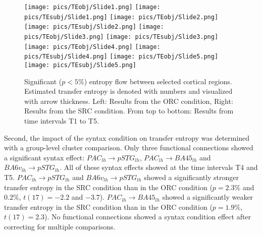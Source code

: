 \begin{figure}[h]
	\begin{center}
		\begin{minipage}{\textwidth}
			\texttt{[image: pics/TEobj/Slide1.png]}
			\texttt{[image: pics/TEsubj/Slide1.png]}
			\texttt{[image: pics/TEobj/Slide2.png]}
			\texttt{[image: pics/TEsubj/Slide2.png]}
			\texttt{[image: pics/TEobj/Slide3.png]}
			\texttt{[image: pics/TEsubj/Slide3.png]}
			\texttt{[image: pics/TEobj/Slide4.png]}
			\texttt{[image: pics/TEsubj/Slide4.png]}
			\texttt{[image: pics/TEobj/Slide5.png]}
			\texttt{[image: pics/TEsubj/Slide5.png]}
		\end{minipage}
		\caption{\label{4.4.networkgraph.a} Significant ($p < 5\%$) entropy flow between selected cortical regions. Estimated transfer entropy is denoted with numbers and visualized with arrow thickness. Left: Results from the ORC condition, Right: Results from the SRC condition. From top to bottom: Results from time intervals T1 to T5.}
	\end{center}
\end{figure}

Second, the impact of the syntax condition on transfer entropy was determined with a group-level cluster comparison.
Only three functional connections showed a significant syntax effect: $PAC_{lh} \rightarrow pSTG_{lh}$, $PAC_{lh} \rightarrow BA45_{lh}$ and $BA6v_{lh} \rightarrow pSTG_{lh}$.
All of these syntax effects showed at the time intervals T4 and T5.
$PAC_{lh} \rightarrow pSTG_{lh}$ and $BA6v_{lh} \rightarrow pSTG_{lh}$ showed a significantly stronger transfer entropy in the SRC condition than in the ORC condition ($p = 2.3\%$ and $0.2\%$, $t(17) = -2.2$ and $-3.7$).
$PAC_{lh} \rightarrow BA45_{lh}$ showed a significantly weaker transfer entropy in the SRC condition than in the ORC condition ($p = 1.9\%$, $t(17) = 2.3$).
No functional connections showed a syntax condition effect after correcting for multiple comparisons.